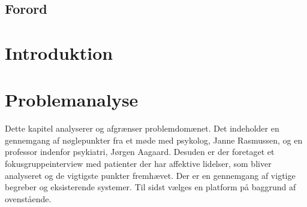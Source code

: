 %
%
%
%
% 



\pagestyle{empty} %

%
\listoftodos
\cleardoublepage

\cleardoublepage

\section*{Forord}

\cleardoublepage

\pagestyle{fancy} %
\setcounter{tocdepth}{2}
\setcounter{secnumdepth}{3}
\tableofcontents

%
\cleardoublepage

\chapter*{Introduktion}


\chapter{Problemanalyse}
Dette kapitel analyserer og afgrænser problemdomænet.
Det indeholder en gennemgang af nøglepunkter fra et møde med psykolog, Janne Rasmussen, og en professor indenfor psykiatri, Jørgen Aagaard.
Desuden er der foretaget et fokusgruppeinterview med patienter der har affektive lidelser, som bliver analyseret og de vigtigste punkter fremhævet.
Der er en gennemgang af vigtige begreber og eksisterende systemer.
Til sidst vælges en platform på baggrund af ovenstående.

